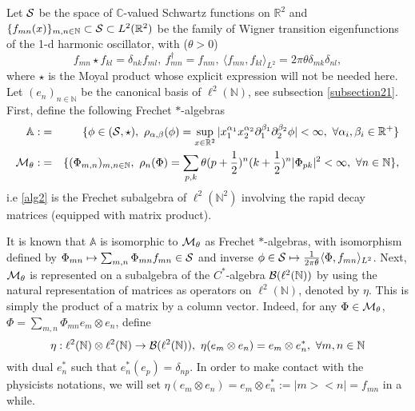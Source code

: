 \documentclass[a4paper]{jpconf}
\numberwithin{equation}{section}
\theoremstyle{nonumberplain}
\begin{document}
Let ${\cal{S}}$ be the space of $\mathbb{C}$-valued Schwartz functions on $\mathbb{R}^2$ and $\{f_{mn}(x) \}_{m,n\in\mathbb{N}}\subset{\cal{S}}\subset L^2(\mathbb{R}^2)$ be the family of Wigner transition eigenfunctions of the 1-d harmonic oscillator, with ($\theta>0$)
\begin{equation}
f_{mn}\star f_{kl}=\delta_{nk}f_{ml},\ f_{mn}^\dag=f_{nm},\ \langle f_{mn},f_{kl} \rangle_{L^2}=2\pi\theta\delta_{mk}\delta_{nl}\label{matrix-base-basic},
\end{equation}
where $\star$ is the Moyal product whose explicit expression will not be needed here. Let $(e_n)_{n\in\mathbb{N}}$ be the canonical basis of $\ell^2(\mathbb{N})$, see subsection \ref{subsection21}. First, define the following Frechet $*$-algebras
\begin{eqnarray}
{\mathbb{A}}:&=&\{\phi\in({\cal{S}},\star),\ \rho_{\alpha,\beta}(\phi)=\sup_{x\in\mathbb{R}^2}|x_1^{\alpha_1}x_2^{\alpha_2}\partial_1^{\beta_1}\partial_2^{\beta_2}\phi|<\infty,\ \forall \alpha_i,\beta_i\in\mathbb{R}^+ \}\label{alg1}\\
{\cal{M}}_\theta:&=&\{(\Phi_{m,n})_{m,n\in\mathbb{N}},\ \rho_n(\Phi)=\sum_{p,k}\theta(p+\frac{1}{2})^n(k+\frac{1}{2})^n|\Phi_{pk}|^2<\infty,\ \forall n\in\mathbb{N}\}\label{alg2},
\end{eqnarray}
i.e \eqref{alg2} is the Frechet subalgebra of $\ell^2(\mathbb{N}^2)$ involving the rapid decay matrices (equipped with matrix product).\par
It is known that ${\mathbb{A}}$ is isomorphic to ${\cal{M}}_\theta$ as Frechet $*$-algebras, with isomorphism defined by $\Phi_{mn}\mapsto \sum_{m,n}\Phi_{mn}f_{mn}\in{\cal{S}}$ and inverse $\phi\in{\cal{S}}\mapsto\frac{1}{2\pi\theta}\langle \Phi,f_{mn}\rangle_{L^2}$. Next, ${\cal{M}}_\theta$ is represented on a subalgebra of the $C^*$-algebra  ${\cal{B}}(\ell^2(\mathbb{N}))$ by using the natural representation of matrices as operators on $\ell^2(\mathbb{N})$, denoted by $\eta$. This is simply the product of a matrix by a column vector. Indeed, for any $\Phi\in{\cal{M}}_\theta$, $\Phi=\sum_{m,n}\Phi_{mn}e_m\otimes e_n$, define
\begin{equation}
\eta:\ell^2(\mathbb{N})\otimes\ell^2(\mathbb{N})\to{\cal{B}}(\ell^2(\mathbb{N})),\ \eta(e_m\otimes e_n)=e_m\otimes e^*_n,\ \forall m,n\in\mathbb{N}\nonumber
\end{equation}
with dual $e^*_n$ such that $e^*_n(e_p)=\delta_{np}$. In order to make contact with the physicists notations, we will set $\eta(e_m\otimes e_n)=e_m\otimes e^*_n:=|m><n|=f_{mn}$ in a while. \par
\end{document}

